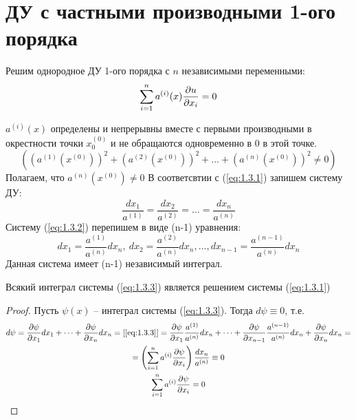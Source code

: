 \documentclass[../main.tex]{subfiles}
\begin{document}
\section{ДУ с частными производными 1-ого порядка}
Решим однородное ДУ 1-ого порядка с $n$ независимыми переменными:
\begin{equation}
	\label{eq:1.3.1}
	\sum_{i=1}^n a^{(i)}(x)\frac{\partial u}{\partial x_i} = 0
\end{equation}

$a^{(i)}(x)$ определены и непрерывны вместе с первыми производными в
окрестности точки $x_0^{(0)}$ и не обращаются одновременно в $0$ в этой точке.
\[
	\left((a^{(1)}(x^{(0)}))^2 + (a^{(2)}(x^{(0)}))^2 + \dots + (a^{(n)}(x^{(0)}))^2 \neq 0\right)
\]
Полагаем, что $a^{(n)}(x^{(0)})\neq 0$
В соответсвтии с (\ref*{eq:1.3.1}) запишем систему ДУ:
\begin{equation}
	\label{eq:1.3.2}
	\frac{dx_1}{a^{(1)}} = \frac{dx_2}{a^{(2)}} = \dots = \frac{dx_n}{a^{(n)}}
\end{equation}
Систему (\ref*{eq:1.3.2}) перепишем в виде (n-1) уравнения:
\begin{equation}
	\label{eq:1.3.3}
	dx_1 = \frac{a^{(1)}}{a^{(n)}}dx_n, \:
	dx_2 = \frac{a^{(2)}}{a^{(n)}}dx_n,
	\dots,
	dx_{n-1} = \frac{a^{(n-1)}}{a^{(n)}}dx_n
\end{equation}
Данная система имеет (n-1) независимый интеграл.
\begin{theorem}
	Всякий интеграл системы (\ref*{eq:1.3.3}) является решением системы (\ref*{eq:1.3.1})
\end{theorem}
\begin{proof}
	Пусть $\psi(x)$ -- интеграл системы (\ref*{eq:1.3.3}). Тогда $d\psi \equiv 0$,
	т.е.
	\begin{gather*}
		d\psi = \pderiv{\psi}{x_1}dx_1 + \dots + \pderiv{\psi}{x_n}dx_n = [\ref*{eq:1.3.3}] =
		\pderiv{\psi}{x_1}\frac{a^{(1)}}{a^{(n)}}dx_n + \dots
		+ \pderiv{\psi}{x_{n-1}}\frac{a^{(n-1)}}{a^{(n)}}dx_n + \pderiv{\psi}{x_n}dx_n = \\
		= \left(\sum_{i=1}^{n}a^{(i)}\pderiv{\psi}{x_i}\right)\frac{dx_n}{a^{(n)}} \equiv 0\\
		\sum_{i=1}^{n}a^{(i)}\pderiv{\psi}{x_i} = 0
	\end{gather*}
\end{proof}
\end{document}
